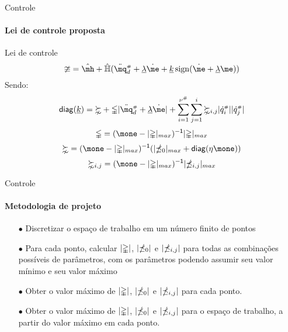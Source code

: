 \documentclass[25pt,landscape]{beamer}
\begin{document}
\begin{frame}{Controle}
    \framesubtitle{Lei de controle proposta}
	\begin{block}{Lei de controle}
    	$$ \mup = \hat{\mh} + \hat{\mH}( \ddot{\mq}\ssh_d + \underline{\lambda}\dot{\me} + \underline{k} \sign(\dot{\me} + \underline{\lambda}\me) ) $$
    	\pause
    	Sendo:
    	$$ \diag(\underline{k})  = \meta + \mGamma |\ddot{\mq}\ssh_d + \underline{\lambda}\dot{\me}| + \sum_{i=1}^{\nu\ssh}\sum_{j=1}^{i} \meta_{i,j} |\dot{q}\ssh_i||\dot{q}\ssh_j| $$
    	$$ \mGamma = (\mone - |\mDelta|_{max} )^\msI |\mDelta|_{max} $$
    	$$ \meta = (\mone - |\mDelta|_{max} )^\msI ( | \mdelta_0 |_{max} + \diag(\eta \mone) ) $$
    	$$ \meta_{i,j} = (\mone - |\mDelta|_{max} )^\msI | \mdelta_{i,j} |_{max} $$
   	\end{block}
\end{frame}

\begin{frame}{Controle}
    \framesubtitle{Metodologia de projeto}
    \begin{block}{}
    	\begin{itemize}
    		\pause
			\item[$\bullet$] Discretizar o espa\c{c}o de trabalho em um n\'umero finito de pontos \\[8pt]
			\pause
			\item[$\bullet$] Para cada ponto, calcular $|\mathbb{\Delta}|$, $|\mathbb{\delta}_0|$ e $|\mathbb{\delta}_{i,j}|$ para todas as combina\c{c}\~oes poss\'iveis de par\^ametros, com os par\^ametros podendo assumir seu valor m\'inimo e seu valor m\'aximo \\[8pt]
			\pause
			\item[$\bullet$] Obter o valor m\'aximo de $|\mathbb{\Delta}|$, $|\mathbb{\delta}_0|$ e $|\mathbb{\delta}_{i,j}|$ para cada ponto. \\[8pt]
			\pause
			\item[$\bullet$] Obter o valor m\'aximo de $|\mathbb{\Delta}|$, $|\mathbb{\delta}_0|$ e $|\mathbb{\delta}_{i,j}|$ para o espa\c{c}o de trabalho, a partir do valor m\'aximo em cada ponto. \\[8pt]
		\end{itemize}
	\end{block}
\end{frame}
\end{document}
